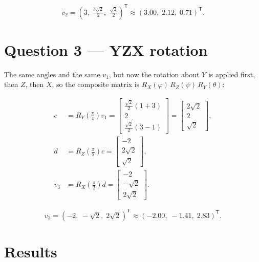 \begin{equation}
\label{eq:hw2-v2}
v_2 = \left(3,\; \tfrac{3\sqrt{2}}{2},\; \tfrac{\sqrt{2}}{2}\right)^{\mathsf{T}}
    \approx (3.00,\; 2.12,\; 0.71)^{\mathsf{T}}.
\end{equation}

\section{Question 3 --- YZX rotation}
\label{sec:hw2-q3}

The same angles and the same $v_1$, but now the rotation about $Y$ is applied
first, then $Z$, then $X$, so the composite matrix is
$R_X(\varphi)\,R_Z(\psi)\,R_Y(\theta)$:

\begin{align*}
c &= R_Y\!\left(\tfrac{\pi}{4}\right) v_1
   = \begin{bmatrix}
       \frac{\sqrt{2}}{2}(1 + 3) \\ 2 \\ \frac{\sqrt{2}}{2}(3 - 1)
     \end{bmatrix}
   = \begin{bmatrix} 2\sqrt{2} \\ 2 \\ \sqrt{2} \end{bmatrix}, \\[4pt]
d &= R_Z\!\left(\tfrac{\pi}{2}\right) c
   = \begin{bmatrix} -2 \\ 2\sqrt{2} \\ \sqrt{2} \end{bmatrix}, \\[4pt]
v_3 &= R_X\!\left(\tfrac{\pi}{2}\right) d
   = \begin{bmatrix} -2 \\ -\sqrt{2} \\ 2\sqrt{2} \end{bmatrix}.
\end{align*}

\begin{equation}
\label{eq:hw2-v3}
v_3 = \left(-2,\; -\sqrt{2},\; 2\sqrt{2}\right)^{\mathsf{T}}
    \approx (-2.00,\; -1.41,\; 2.83)^{\mathsf{T}}.
\end{equation}

\section{Results}
\label{sec:hw2-results}

